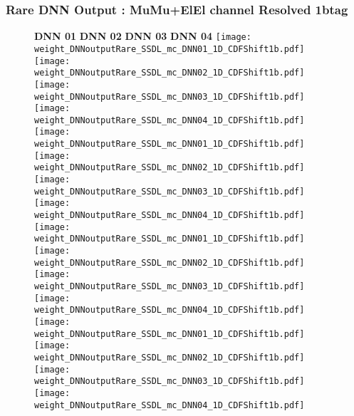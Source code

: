 \documentclass[9pt]{beamer}
\begin{document}
\begin{frame}
	\frametitle{Rare DNN Output : MuMu+ElEl channel Resolved 1btag}
	\begin{figure}
	    \textbf{DNN 01} \hspace{1.2cm} \textbf{DNN 02} \hspace{1.2cm} \textbf{DNN 03} \hspace{1.2cm} \textbf{DNN 04}
        \centering
		\texttt{[image: weight\_DNNoutputRare\_SSDL\_mc\_DNN01\_1D\_CDFShift1b.pdf]}
		\texttt{[image: weight\_DNNoutputRare\_SSDL\_mc\_DNN02\_1D\_CDFShift1b.pdf]}
		\texttt{[image: weight\_DNNoutputRare\_SSDL\_mc\_DNN03\_1D\_CDFShift1b.pdf]}
		\texttt{[image: weight\_DNNoutputRare\_SSDL\_mc\_DNN04\_1D\_CDFShift1b.pdf]}\\
		\texttt{[image: weight\_DNNoutputRare\_SSDL\_mc\_DNN01\_1D\_CDFShift1b.pdf]}
		\texttt{[image: weight\_DNNoutputRare\_SSDL\_mc\_DNN02\_1D\_CDFShift1b.pdf]}
		\texttt{[image: weight\_DNNoutputRare\_SSDL\_mc\_DNN03\_1D\_CDFShift1b.pdf]}
		\texttt{[image: weight\_DNNoutputRare\_SSDL\_mc\_DNN04\_1D\_CDFShift1b.pdf]}\\
		\texttt{[image: weight\_DNNoutputRare\_SSDL\_mc\_DNN01\_1D\_CDFShift1b.pdf]}
		\texttt{[image: weight\_DNNoutputRare\_SSDL\_mc\_DNN02\_1D\_CDFShift1b.pdf]}
		\texttt{[image: weight\_DNNoutputRare\_SSDL\_mc\_DNN03\_1D\_CDFShift1b.pdf]}
		\texttt{[image: weight\_DNNoutputRare\_SSDL\_mc\_DNN04\_1D\_CDFShift1b.pdf]}\\
		\texttt{[image: weight\_DNNoutputRare\_SSDL\_mc\_DNN01\_1D\_CDFShift1b.pdf]}
		\texttt{[image: weight\_DNNoutputRare\_SSDL\_mc\_DNN02\_1D\_CDFShift1b.pdf]}
		\texttt{[image: weight\_DNNoutputRare\_SSDL\_mc\_DNN03\_1D\_CDFShift1b.pdf]}
		\texttt{[image: weight\_DNNoutputRare\_SSDL\_mc\_DNN04\_1D\_CDFShift1b.pdf]}\\
	\end{figure}
\end{frame}
\end{document}
